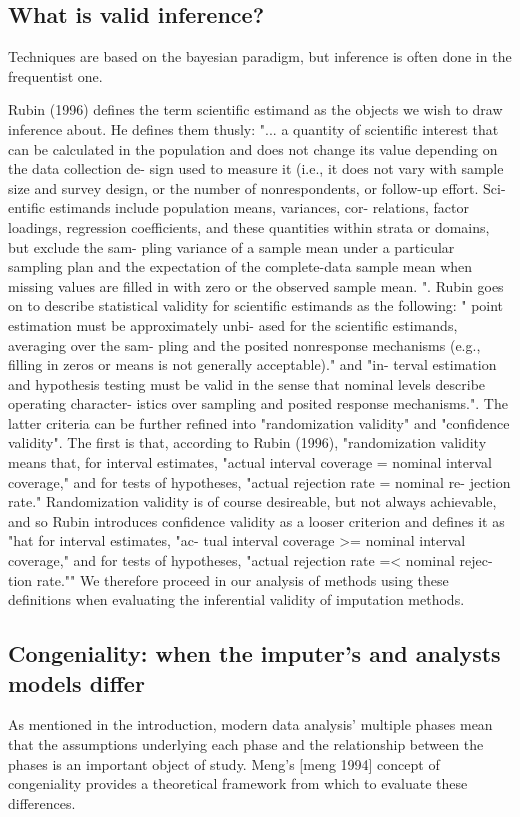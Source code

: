 \documentclass{article}
\begin{document}
	\subsection{What is valid inference?}
	Techniques are based on the bayesian paradigm, but inference is often done in the frequentist one.
	
	Rubin (1996) defines the term scientific estimand as the objects we wish to draw inference about. He defines them thusly: "... a quantity of scientific
	interest that can be calculated in the population and does
	not change its value depending on the data collection de-
	sign used to measure it (i.e., it does not vary with sample
	size and survey design, or the number of nonrespondents,
	or follow-up effort. Sci-
	entific estimands include population means, variances, cor-
	relations, factor loadings, regression coefficients, and these
	quantities within strata or domains, but exclude the sam-
	pling variance of a sample mean under a particular sampling
	plan and the expectation of the complete-data sample mean
	when missing values are filled in with zero or the observed sample mean. ". Rubin goes on to describe statistical validity for scientific estimands as the following: " point estimation must be approximately unbi-
	ased for the scientific estimands, averaging over the sam-
	pling and the posited nonresponse mechanisms (e.g., filling
	in zeros or means is not generally acceptable)." and "in-
	terval estimation and hypothesis testing must be valid in
	the sense that nominal levels describe operating character-
	istics over sampling and posited response mechanisms.". The latter criteria can be further refined into "randomization validity" and "confidence validity". The first is that, according to Rubin (1996),  "randomization validity means that, for interval estimates,
	"actual interval coverage = nominal interval coverage," and
	for tests of hypotheses, "actual rejection rate = nominal re-
	jection rate."  Randomization validity is of course desireable, but not always achievable, and so Rubin introduces confidence validity as a looser criterion and defines it as "hat for interval estimates, "ac-
	tual interval coverage >= nominal interval coverage," and for
	tests of hypotheses, "actual rejection rate =< nominal rejec-
	tion rate."" We therefore proceed in our analysis of methods using these definitions when evaluating the inferential validity of imputation methods.
	
	
	\subsection{Congeniality: when the imputer's and analysts models differ}
	As mentioned in the introduction, modern data analysis' multiple phases mean that the assumptions underlying each phase and the relationship between the phases is an important object of study. Meng's [meng 1994] concept of congeniality provides a theoretical framework from which to evaluate these differences.
	
\end{document}
